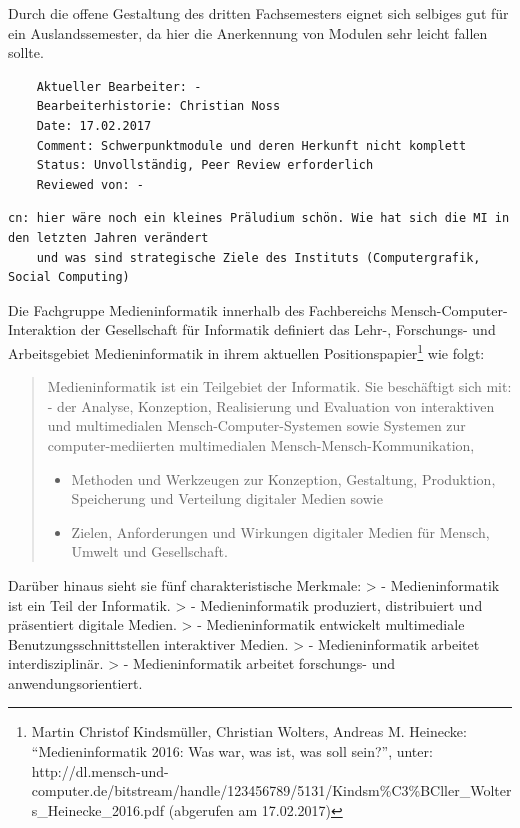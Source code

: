 Durch die offene Gestaltung des dritten Fachsemesters eignet sich
selbiges gut für ein Auslandssemester, da hier die Anerkennung von
Modulen sehr leicht fallen sollte.

\begin{verbatim}
    Aktueller Bearbeiter: -
    Bearbeiterhistorie: Christian Noss
    Date: 17.02.2017
    Comment: Schwerpunktmodule und deren Herkunft nicht komplett
    Status: Unvollständig, Peer Review erforderlich
    Reviewed von: -
\end{verbatim}

\begin{verbatim}
cn: hier wäre noch ein kleines Präludium schön. Wie hat sich die MI in den letzten Jahren verändert
    und was sind strategische Ziele des Instituts (Computergrafik, Social Computing)
\end{verbatim}

Die Fachgruppe Medieninformatik innerhalb des Fachbereichs
Mensch-Computer-Interaktion der Gesellschaft für Informatik definiert
das Lehr-, Forschungs- und Arbeitsgebiet Medieninformatik in ihrem
aktuellen Positionspapier\footnote{Martin Christof Kindsmüller,
  Christian Wolters, Andreas M. Heinecke: ``Medieninformatik 2016: Was
  war, was ist, was soll sein?'', unter:
  http://dl.mensch-und-computer.de/bitstream/handle/123456789/5131/Kindsm\%C3\%BCller\_Wolters\_Heinecke\_2016.pdf
  (abgerufen am 17.02.2017)} wie folgt:

\begin{quote}
Medieninformatik ist ein Teilgebiet der Informatik. Sie beschäftigt sich
mit: - der Analyse, Konzeption, Realisierung und Evaluation von
interaktiven und multimedialen Mensch-Computer-Systemen sowie Systemen
zur computer-mediierten multimedialen Mensch-Mensch-Kommunikation,

\begin{itemize}
\tightlist
\item
  Methoden und Werkzeugen zur Konzeption, Gestaltung, Produktion,
  Speicherung und Verteilung digitaler Medien sowie
\item
  Zielen, Anforderungen und Wirkungen digitaler Medien für Mensch,
  Umwelt und Gesellschaft.
\end{itemize}
\end{quote}

Darüber hinaus sieht sie fünf charakteristische Merkmale: \textgreater{}
- Medieninformatik ist ein Teil der Informatik. \textgreater{} -
Medieninformatik produziert, distribuiert und präsentiert digitale
Medien. \textgreater{} - Medieninformatik entwickelt multimediale
Benutzungsschnittstellen interaktiver Medien. \textgreater{} -
Medieninformatik arbeitet interdisziplinär. \textgreater{} -
Medieninformatik arbeitet forschungs- und anwendungsorientiert.

